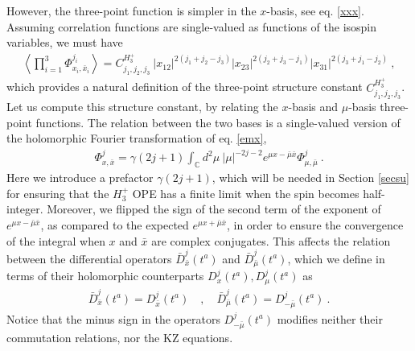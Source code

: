 \documentclass[12pt,a4paper,notitlepage]{report}
\numberwithin{equation}{section}
\theoremstyle{break}
\begin{document}
However, the three-point function is simpler in the $x$-basis, see eq. \eqref{xxx}.
Assuming correlation functions are single-valued as functions of the isospin variables, we must have
\begin{align}
  \left\langle \prod_{i=1}^3 \Phi^{j_i}_{x_i,\bar{x}_i} \right\rangle = C^{H_3^+}_{j_1,j_2,j_3}\ |x_{12}|^{2(j_1+j_2-j_3)} |x_{23}|^{2(j_2+j_3-j_1)} |x_{31}|^{2(j_3+j_1-j_2)}\ ,
\label{ch}
\end{align}
which provides a natural definition of the three-point structure constant $C^{H_3^+}_{j_1,j_2,j_3}$.
Let us compute this structure constant, by relating the $x$-basis and $\mu$-basis three-point functions.
The relation between the two bases is a single-valued version of the holomorphic Fourier transformation of eq. \eqref{emx}, 
\begin{align}
 \Phi^j_{x,\bar{x}} = \gamma(2j+1)\int_{{\mathbb{C}}} d^2\mu\ |\mu|^{-2j-2} e^{\mu x -\bar{\mu}\bar{x}}\Phi^j_{\mu,\bar{\mu}}\ .
\end{align}
Here we introduce a prefactor $\gamma(2j+1)$, which will be needed in Section \ref{secsu} for ensuring that the $H_3^+$ OPE has a finite limit when the spin becomes half-integer.
Moreover, we flipped the sign of the second term of the exponent of $e^{\mu x -\bar{\mu}\bar{x}}$, as compared to the expected $e^{\mu x +\bar{\mu}\bar{x}}$, in order to ensure the convergence of the integral when $x$ and $\bar{x}$ are complex conjugates.
This affects the relation between the differential operators $\bar{D}^j_{\bar{x}}(t^a)$ and $\bar{D}^j_{\bar{\mu}}(t^a)$, which we define in terms of their holomorphic counterparts $D^j_x(t^a), D^j_\mu(t^a)$ as 
\begin{align}
 \bar{D}^j_{\bar{x}}(t^a) = D^j_{\bar{x}}(t^a)  \quad , \quad \bar{D}^j_{\bar{\mu}}(t^a) = D^j_{-\bar{\mu}}(t^a)\ . 
\end{align}
Notice that the minus sign in the operators $D^j_{-\bar{\mu}}(t^a)$ modifies neither their commutation relations, nor the KZ equations.
\end{document}
